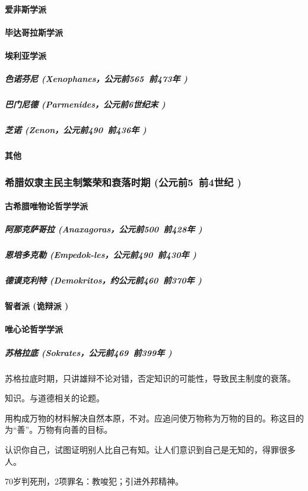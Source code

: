 \documentclass[UTF8]{../RepresentationUniverse}
\begin{document}
        \paragraph{爱非斯学派}
        \paragraph{毕达哥拉斯学派}
        \paragraph{埃利亚学派}
            \subparagraph{色诺芬尼 (Xenophanes，公元前565~前473年 )}
            \subparagraph{巴门尼德 (Parmenides，公元前6世纪末 )}
            \subparagraph{芝诺 (Zenon，公元前490~前436年 )}
        \paragraph{其他}

    \subsubsection{希腊奴隶主民主制繁荣和衰落时期 (公元前5~前4世纪 )}
        \paragraph{古希腊唯物论哲学学派}
            \subparagraph{阿那克萨哥拉 (Anaxagoras，公元前500~前428年 )}
            \subparagraph{恩培多克勒 (Empedok-les，公元前490~前430年 )}
            \subparagraph{德谟克利特 (Demokritos，约公元前460~前370年 )}
        \paragraph{智者派 (诡辩派 )}
        \paragraph{唯心论哲学学派}
            \subparagraph{苏格拉底 (Sokrates，公元前469~前399年 )}
            苏格拉底时期，只讲雄辩不论对错，否定知识的可能性，导致民主制度的衰落。

            知识。与道德相关的论题。
    
            用构成万物的材料解决自然本原，不对。应追问使万物称为万物的目的。称这目的为“善”。万物有向善的目标。
    
            认识你自己，试图证明别人比自己有知。让人们意识到自己是无知的，得罪很多人。
    
            70岁判死刑，2项罪名：教唆犯；引进外邦精神。
    
\end{document}
